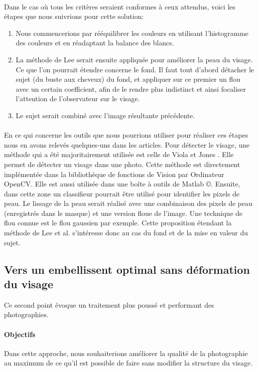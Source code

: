 \documentclass[11pt, french,screen]{report-rd-info}
\begin{document}
\paragraph{}
Dans le cas où tous les critères seraient conformes à ceux attendus, voici les étapes que nous suivrions pour cette solution:
\begin{enumerate}
\item Nous commencerions par rééquilibrer les couleurs en utilisant l’histogramme des couleurs et en réadaptant la balance des blancs.
\item La méthode de Lee  \cite{Lee} serait ensuite appliquée pour améliorer la peau du visage. Ce que l’on pourrait étendre concerne le fond. Il faut tout d’abord détacher le sujet (du buste aux cheveux) du fond, et appliquer sur ce premier un flou avec un certain coefficient, afin de le rendre plus indistinct et ainsi focaliser l’attention de l’observateur sur le visage.
\item Le sujet serait combiné avec l’image résultante précédente.
\end{enumerate}
\paragraph{}
En ce qui concerne les outils que nous pourrions utiliser pour réaliser ces étapes nous en avons relevés quelques-uns dans les articles. Pour détecter le visage, une méthode qui a été majoritairement utilisée est celle de Viola et Jones \cite{Viola2004}. Elle permet de détecter un visage dans une photo. Cette méthode est directement implémentée dans la bibliothèque de fonctions de Vision par Ordinateur OpenCV. Elle est aussi utilisée dans une boîte à outils de Matlab \copyright. Ensuite, dans cette zone un classifieur pourrait être utilisé pour identifier les pixels de peau.
Le lissage de la peau serait réalisé avec une combinaison des pixels de peau (enregistrés dans le masque) et une version floue de l’image. Une technique de flou connue est le flou gaussien par exemple.
Cette proposition étendant la méthode de Lee et al. \cite{Lee} s’intéresse donc au cas du fond et de la mise en valeur du sujet.
\subsection{Vers un embellissent optimal sans déformation du visage}
\label{propdeux}
Ce second point évoque un traitement plus poussé et performant des photographies.
\paragraph{Objectifs}
Dans cette approche, nous souhaiterions améliorer la qualité de la photographie au maximum de ce qu’il est possible de faire sans modifier la structure du visage.
\end{document}
